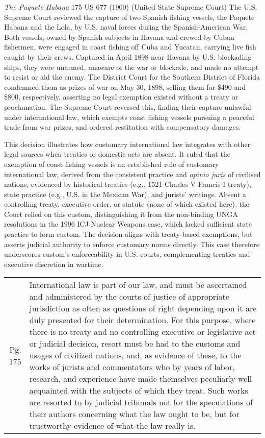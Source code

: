 \begin{casedetails}{\textit{The Paquete Habana} 175 US 677 (1900) (United State Supreme Court)}
    \flushleft
    The U.S. Supreme Court reviewed the capture of two Spanish fishing vessels, the Paquete Habana and the Lola, by U.S. naval forces during the Spanish-American War. Both vessels, owned by Spanish subjects in Havana and crewed by Cuban fishermen, were engaged in coast fishing off Cuba and Yucatan, carrying live fish caught by their crews. Captured in April 1898 near Havana by U.S. blockading ships, they were unarmed, unaware of the war or blockade, and made no attempt to resist or aid the enemy. The District Court for the Southern District of Florida condemned them as prizes of war on May 30, 1898, selling them for \$490 and \$800, respectively, asserting no legal exemption existed without a treaty or proclamation. The Supreme Court reversed this, finding their capture unlawful under international law, which exempts coast fishing vessels pursuing a peaceful trade from war prizes, and ordered restitution with compensatory damages.

    \vspace{\baselineskip}

    This decision illustrates how customary international law integrates with other legal sources when treaties or domestic acts are absent. It ruled that the exemption of coast fishing vessels is an established rule of customary international law, derived from the consistent practice and \textit{opinio juris} of civilised nations, evidenced by historical treaties (e.g., 1521 Charles V-Francis I treaty), state practice (e.g., U.S. in the Mexican War), and jurists' writings. Absent a controlling treaty, executive order, or statute (none of which existed here), the Court relied on this custom, distinguishing it from the non-binding UNGA resolutions in the 1996 ICJ Nuclear Weapons case, which lacked sufficient state practice to form custom. The decision aligns with treaty-based exemptions, but asserts judicial authority to enforce customary norms directly. This case therefore underscores custom's enforceability in U.S. courts, complementing treaties and executive discretion in wartime.

    \begin{longtable}{r|>{\raggedright\arraybackslash}p{}}
        Pg. 175 & International law is part of our law, and must be ascertained and administered by the courts of justice of appropriate jurisdiction as often as questions of right depending upon it are duly presented for their determination. For this purpose, where there is no treaty and no controlling executive or legislative act or judicial decision, resort must be had to the customs and usages of civilized nations, and, as evidence of these, to the works of jurists and commentators who by years of labor, research, and experience have made themselves peculiarly well acquainted with the subjects of which they treat. Such works are resorted to by judicial tribunals not for the speculations of their authors concerning what the law ought to be, but for trustworthy evidence of what the law really is.
    \end{longtable}
\end{casedetails}

